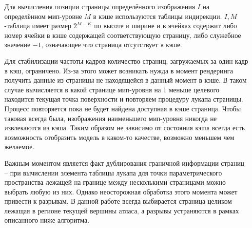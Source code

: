 Для вычисления позиции страницы определённого изображения $I$ на определённом мип-уровне $M$ в кэше используются таблицы индирекции. $I,M$-таблица имеет размер $2^{M - K}$ по высоте и ширине и в ячейках содержит либо номер ячейки в кэше содержащей соответствующую страницу, либо служебное значение $-1$, означающее что страница отсутствует в кэше.

Для стабилизации частоты кадров количество страниц, загружаемых за один кадр в кэш, ограничено. Из-за этого может возникать нужда в момент рендеринга получить данные из страницы не находящейся в данный момент в кэше. В таком случае вычисляется в какой странице мип-уровня на 1 меньше целевого находится текущая точка поверхности и повторяем процедуру лукапа страницы. Процесс повторяется пока не будет найдена доступная в кэше страница. Чтобы таковая всегда была, изображения наименьшего мип-уровня никогда не извлекаются из кэша. Таким образом не зависимо от состояния кэша всегда есть возможность отобразить модель в каком-то качестве, возможно меньшем чем желаемое.

Важным моментом является факт дублирования граничной информации страниц -- при вычислении элемента таблицы лукапа для точки параметрического пространства лежащей на границе между несколькими страницами можно выбрать любую из них. Однако неосторожная обработка этого момента может привести к разрывам. В данной работе всегда выбирается страница целиком лежащая в регионе текущей вершины атласа, а разрывы устраняются в рамках описанного ниже алгоритма.

